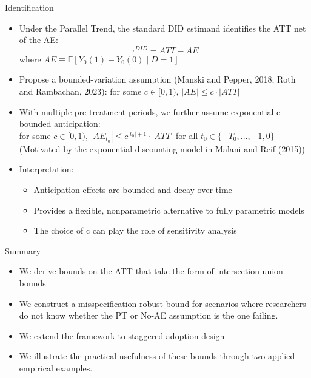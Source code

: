\documentclass[aspectratio=1610, 9pt]{beamer}
\begin{document}
\begin{frame}{Identification}
\begin{itemize}
    \item Under the Parallel Trend, the standard DID estimand identifies the ATT net of the AE:
     $$\tau^{DID} = ATT-AE$$ where $AE\equiv\mathbb{E}[Y_0(1)-Y_0(0)\mid D=1]$
     \item Propose a bounded-variation assumption (Manski and Pepper, 2018; Roth and Rambachan, 2023): for some $c\in [0,1)$, $|AE| \leq c\cdot|ATT|$ 
     

     \item With multiple pre-treatment periods, we further assume exponential c-bounded anticipation: \\for some $c \in [0,1)$, 
        $|AE_{t_0}|\leq c^{|t_0|+1}\cdot |ATT|$ for all $t_0\in \{-T_0,...,-1,0\}$\\
        (Motivated by the exponential discounting model in Malani and Reif (2015))

        \item Interpretation:
    \begin{itemize}
        \item[-] Anticipation effects are bounded and decay over time
        \item[-] Provides a flexible, nonparametric alternative to fully parametric models
        \item[-] The choice of c can play the role of sensitivity analysis
    \end{itemize}
  
\end{itemize} 

\end{frame}


\begin{frame}{Summary}
\begin{itemize}
    \item We derive bounds on the ATT that take the form of intersection-union bounds
    \item We construct a misspecification robust bound for scenarios where researchers do not know whether the PT or No-AE assumption is the one failing.
    \item We extend the framework to staggered adoption design
    \item We illustrate the practical usefulness of these bounds through two applied empirical examples.
\end{itemize}


\end{frame}
\end{document}
